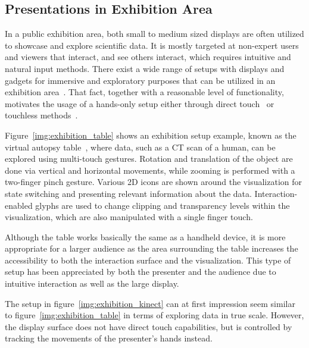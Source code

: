 \documentclass[review,journal]{vgtc}         %
\begin{document}
\subsection{Presentations in Exhibition Area} \label{sec:exhibition}
In a public exhibition area, both small to medium sized displays are often utilized to showcase and explore scientific data.
It is mostly targeted at non-expert users and viewers that interact, and see others interact, which requires intuitive and natural input methods.
There exist a wide range of setups with displays and gadgets for immersive and exploratory purposes that can be utilized in an exhibition area~\cite{Laha:2013:VCB:2491367.2491368, conf/egve/KruszynskiL08}.
That fact, together with a reasonable level of functionality, motivates the usage of a hands-only setup either through direct touch~\cite{Klein:2012:DSD:2322389.2322403} or touchless methods~\cite{O'hara:2013:NTP:2442106.2442111}.

Figure~\ref{img:exhibition_table} shows an exhibition setup example, known as the virtual autopsy table~\cite{LRFPY11}, where data, such as a CT scan of a human, can be explored using multi-touch gestures.
Rotation and translation of the object are done via vertical and horizontal movements, while zooming is performed with a two-finger pinch gesture.
Various 2D icons are shown around the visualization for state switching and presenting relevant information about the data.
Interaction-enabled glyphs are used to change clipping and transparency levels within the visualization, which are also manipulated with a single finger touch.

Although the table works basically the same as a handheld device, it is more appropriate for a larger audience as the area surrounding the table increases the accessibility to both the interaction surface and the visualization. This type of setup has been appreciated by both the presenter and the audience due to intuitive interaction as well as the large display.


The setup in figure~\ref{img:exhibition_kinect} can at first impression seem similar to figure~\ref{img:exhibition_table} in terms of exploring data in true scale.
However, the display surface does not have direct touch capabilities, but is controlled by tracking the movements of the presenter's hands instead.
\end{document}
